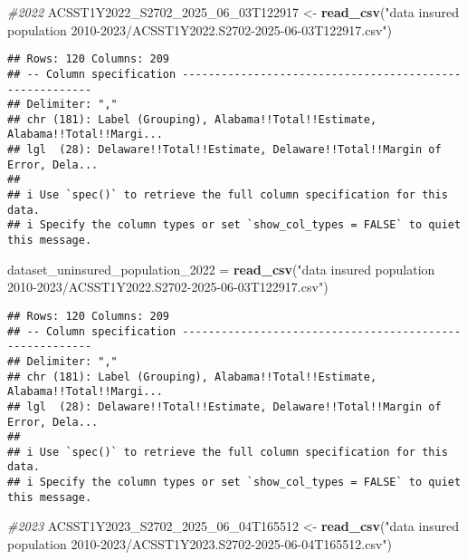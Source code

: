\documentclass[
]{article}
\newenvironment{Shaded}{\begin{snugshade}}{\end{snugshade}}
\newcommand{\CommentTok}[1]{\textcolor[rgb]{0.56,0.35,0.01}{\textit{#1}}}
\newcommand{\FunctionTok}[1]{\textcolor[rgb]{0.13,0.29,0.53}{\textbf{#1}}}
\newcommand{\NormalTok}[1]{#1}
\newcommand{\OtherTok}[1]{\textcolor[rgb]{0.56,0.35,0.01}{#1}}
\newcommand{\StringTok}[1]{\textcolor[rgb]{0.31,0.60,0.02}{#1}}
\begin{document}
\begin{Shaded}
\begin{Highlighting}[]
\CommentTok{\#2022}
\NormalTok{ACSST1Y2022\_S2702\_2025\_06\_03T122917 }\OtherTok{\textless{}{-}} \FunctionTok{read\_csv}\NormalTok{(}\StringTok{"data insured population 2010{-}2023/ACSST1Y2022.S2702{-}2025{-}06{-}03T122917.csv"}\NormalTok{)}
\end{Highlighting}
\end{Shaded}

\begin{verbatim}
## Rows: 120 Columns: 209
## -- Column specification --------------------------------------------------------
## Delimiter: ","
## chr (181): Label (Grouping), Alabama!!Total!!Estimate, Alabama!!Total!!Margi...
## lgl  (28): Delaware!!Total!!Estimate, Delaware!!Total!!Margin of Error, Dela...
## 
## i Use `spec()` to retrieve the full column specification for this data.
## i Specify the column types or set `show_col_types = FALSE` to quiet this message.
\end{verbatim}

\begin{Shaded}
\begin{Highlighting}[]
\NormalTok{dataset\_uninsured\_population\_2022 }\OtherTok{=} \FunctionTok{read\_csv}\NormalTok{(}\StringTok{"data insured population 2010{-}2023/ACSST1Y2022.S2702{-}2025{-}06{-}03T122917.csv"}\NormalTok{)}
\end{Highlighting}
\end{Shaded}

\begin{verbatim}
## Rows: 120 Columns: 209
## -- Column specification --------------------------------------------------------
## Delimiter: ","
## chr (181): Label (Grouping), Alabama!!Total!!Estimate, Alabama!!Total!!Margi...
## lgl  (28): Delaware!!Total!!Estimate, Delaware!!Total!!Margin of Error, Dela...
## 
## i Use `spec()` to retrieve the full column specification for this data.
## i Specify the column types or set `show_col_types = FALSE` to quiet this message.
\end{verbatim}

\begin{Shaded}
\begin{Highlighting}[]
\CommentTok{\#2023}
\NormalTok{ACSST1Y2023\_S2702\_2025\_06\_04T165512 }\OtherTok{\textless{}{-}} \FunctionTok{read\_csv}\NormalTok{(}\StringTok{"data insured population 2010{-}2023/ACSST1Y2023.S2702{-}2025{-}06{-}04T165512.csv"}\NormalTok{)}
\end{Highlighting}
\end{Shaded}
\end{document}

